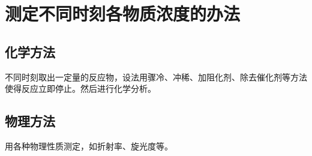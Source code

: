 \section{测定不同时刻各物质浓度的办法}

\subsection{化学方法}

不同时刻取出一定量的反应物，设法用骤冷、冲稀、加阻化剂、除去催化剂等方法使得反应立即停止。然后进行化学分析。

\subsection{物理方法}

用各种物理性质测定，如折射率、旋光度等。
